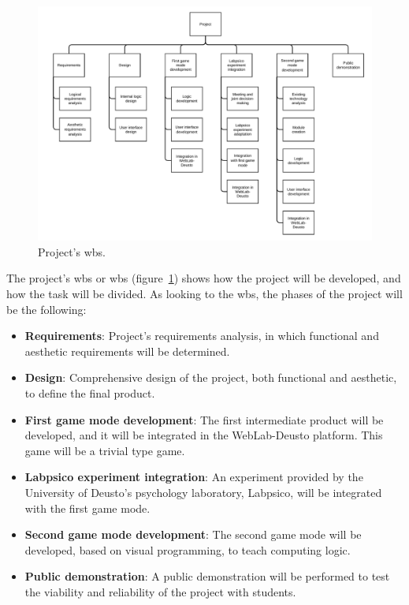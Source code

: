 \begin{figure}
	\centering
	\includegraphics[height=0.9\textwidth, angle=90]{fig/wbs}
	\caption{Project's \acrlong{wbs}.}\label{fig:wbs}
\end{figure}

The project's \acrlong{wbs} or \acrshort{wbs} (figure~\ref{fig:wbs}) shows how the project will be
developed, and how the task will be divided. As looking to the \acrshort{wbs}, the phases of the
project will be the following:

\begin{itemize}
\item \textbf{Requirements}: Project's requirements analysis, in which functional and aesthetic
requirements will be determined.

\item \textbf{Design}: Comprehensive design of the project, both functional and aesthetic, to define
the final product.

\item \textbf{First game mode development}: The first intermediate product will be developed, and it
will be integrated in the WebLab-Deusto platform. This game will be a trivial type game.

\item \textbf{Labpsico experiment integration}: An experiment provided by the University of Deusto's
psychology laboratory, Labpsico, will be integrated with the first game mode.

\item \textbf{Second game mode development}: The second game mode will be developed, based on visual
programming, to teach computing logic.

\item \textbf{Public demonstration}: A public demonstration will be performed to test the viability
and reliability of the project with students.
\end{itemize}

